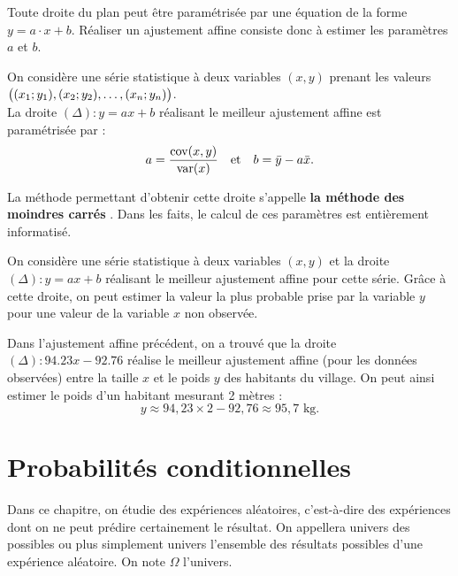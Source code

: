 \documentclass[a4paper, 12pt]{report}
\begin{document}
\begin{rmq}
Toute droite du plan peut être paramétrisée par une équation de la forme $y = a \cdot x + b$. Réaliser un ajustement affine consiste
donc à estimer les paramètres $a$ et $b$.
\end{rmq}

\begin{thm}
On considère une série statistique à deux variables $(x,y)$ prenant les valeurs $\bigl( (x_1; y_1), (x_2; y_2), \dots, (x_n;y_n) \bigr)$. \\
La droite $(\Delta) : y=ax + b$ réalisant le meilleur ajustement affine est paramétrisée par :
\[ a = \dfrac{\operatorname{cov}(x,y)}{\operatorname{var}(x)} \quad \text{et} \quad b = \bar{y} - a \bar{x} . \]
\end{thm}

\begin{rmq}
La méthode permettant d'obtenir cette droite s'appelle \og \textbf{la méthode des moindres carrés} \fg. 
Dans les faits, le calcul de ces paramètres est entièrement informatisé. 
\end{rmq}

\begin{prop}
On considère une série statistique à deux variables $(x,y)$ et la droite $(\Delta) : y=ax + b$ réalisant le meilleur ajustement affine
pour cette série. Grâce à cette droite, on peut estimer la valeur la plus probable prise par la variable $y$ pour une valeur de la variable
$x$ non observée.
\end{prop}

\begin{ex}
Dans l'ajustement affine précédent, on a trouvé que la droite $(\Delta) : 94.23 x - 92.76$ réalise le meilleur ajustement affine (pour les
données observées) entre la taille $x$ et le poids $y$ des habitants du village. On peut ainsi estimer le poids d'un habitant mesurant 
2 mètres :
\[ y \approx 94,23 \times 2 - 92,76 \approx 95,7 \text{ kg} . \]
\end{ex}

\chapter{Probabilités conditionnelles}

Dans ce chapitre, on étudie des expériences aléatoires, c'est-à-dire des expériences dont on ne peut prédire certainement le résultat.
On appellera \og univers des possibles \fg{} ou plus simplement \og univers \fg{} l'ensemble des résultats possibles d'une expérience 
aléatoire. On note $\Omega$ l'univers. \\
\end{document}
